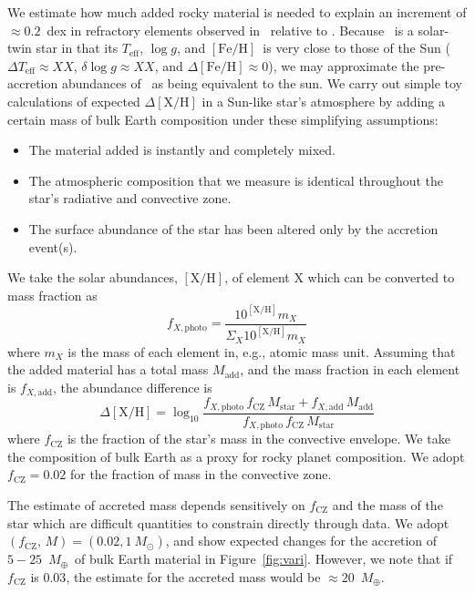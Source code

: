 \documentclass[12pt,letterpaper,margin=1in]{article}
\newcommand{\figname}{Figure}
\newcommand*\elem[1]{\ensuremath{\mathrm{#1}}}
\newcommand*\elemH[1]{\ensuremath{[\mathrm{#1}/\elem{H}]}}
\newcommand*\logg{\ensuremath{\log{g}}}
\newcommand*{\feh}{\ensuremath{\elemH{Fe}}}
\newcommand{\sunanalog}{\text{Krios}}
\newcommand{\bizarreone}{\text{Kronos}}
\newcommand{\mearth}{\ensuremath{M_\oplus}}
\begin{document}
We estimate how much added rocky material is needed to explain an
increment of $\approx 0.2$~dex in refractory elements observed in \bizarreone\
relative to \sunanalog\cite{Mack:2014aa,Mack:2016aa}.
Because \sunanalog\ is a solar-twin star in that its $T_\mathrm{eff}$, \logg,
and \feh\ is very close to those of the Sun ($\Delta T_\mathrm{eff} \approx XX$,
$\delta\logg \approx XX$, and $\Delta\feh \approx 0$),
we may approximate the pre-accretion abundances of \bizarreone\ as being
equivalent to the sun.
We carry out simple toy calculations of expected $\Delta\elemH{X}$
in a Sun-like star's atmosphere by adding a certain mass of bulk Earth
composition under these simplifying assumptions:
\begin{itemize}
  \item The material added is instantly and completely mixed.
  \item The atmospheric composition that we measure is identical throughout
    the star's radiative and convective zone.
  \item The surface abundance of the star has been altered only by the
    accretion event(s).
\end{itemize}
We take the solar abundances\cite{Asplund:2009aa}, $\elemH{X}$, of element \elem{X}
which can be converted to mass fraction as
\begin{equation}
  f_{X,\mathrm{photo}} = \frac{10^{\elemH{X}} m_X}{\Sigma_X 10^{\elemH{X}} m_X}
\end{equation}
where $m_X$ is the mass of each element in, e.g., atomic mass unit.
Assuming that the added material has a total mass $M_\mathrm{add}$, and the
mass fraction in each element is $f_{X,\mathrm{add}}$,
the abundance difference is
\begin{equation}
  \Delta\elemH{X} = \log_{10} \frac{f_{X,\mathrm{photo}}\,f_\mathrm{CZ}\,M_\mathrm{star}
    + f_{X,\mathrm{add}}\,M_\mathrm{add}}
    {f_{X,\mathrm{photo}}\,f_\mathrm{CZ}\,M_\mathrm{star}}
\end{equation}
where $f_\mathrm{CZ}$ is the fraction of the star's mass in the convective envelope.
We take the composition of bulk Earth\cite{mcdonough2001composition}
as a proxy for rocky planet composition. We adopt $f_\mathrm{CZ} = 0.02$ for
the fraction of mass in the convective zone\cite{Pinsonneault:2001aa}.

The estimate of accreted mass depends sensitively on $f_\mathrm{CZ}$ and the
mass of the star which are difficult quantities to constrain directly through
data.
We adopt $(f_\mathrm{CZ},\,M) = (0.02, 1~M_\odot)$, and show
expected changes for the accretion of $5-25$~\mearth\ of bulk Earth material
in \figname~\ref{fig:vari}.
However, we note that if $f_\mathrm{CZ}$ is $0.03$, the estimate for the accreted
mass would be $\approx 20$~\mearth.
\end{document}
